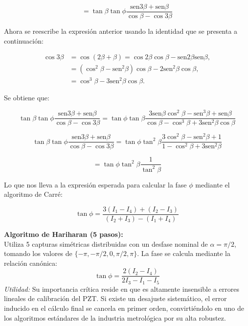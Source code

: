\documentclass[12pt,letterpaper]{article}
\begin{document}
\begin{enumerate}
		\begin{equation}
			= \tan\beta\tan\phi\frac{\text{sen}3\beta + \text{sen}\beta}{\cos\beta - \cos3\beta}
		\end{equation}
		
		Ahora se reescribe la expresión anterior usando la identidad que se presenta a continuación:
		
		\begin{equation}
			\begin{aligned}
				\cos3\beta &= \cos(2\beta + \beta) = \cos2\beta\cos\beta - \text{sen}2\beta\text{sen}\beta, \\
				&= (\cos^2\beta - \text{sen}^2\beta)\cos\beta - 2\text{sen}^2\beta\cos\beta, \\
				&= \cos^3\beta - 3\text{sen}^2\beta\cos\beta.
			\end{aligned}
		\end{equation}
		
		Se obtiene que:	
		
		\begin{equation}
			\tan\beta\tan\phi\frac{\text{sen}3\beta + \text{sen}\beta}{\cos\beta - \cos3\beta} = \tan\phi\tan\beta\frac{3\text{sen}\beta\cos^2\beta - \text{sen}^3\beta + \text{sen}\beta}{\cos\beta - \cos^3\beta + 3\text{sen}^2\beta\cos\beta}
		\end{equation}
		
		\begin{equation}
			\tan\beta\tan\phi\frac{\text{sen}3\beta + \text{sen}\beta}{\cos\beta - \cos3\beta} = \tan\phi\tan^2\beta\frac{3\cos^2\beta - \text{sen}^2\beta + 1}{1 - \cos^2\beta + 3\text{sen}^2\beta}
		\end{equation}
		
		\begin{equation}
			= \tan\phi\tan^2\beta\frac{1}{\tan^2\beta}
		\end{equation}
		
		Lo que nos lleva a la expresión esperada para calcular la fase $\phi$ mediante el algoritmo de Carré:
		
		\begin{equation}
			\tan\phi = \frac{3(I_1 - I_4) + (I_2 - I_3)}{(I_2 + I_3) - (I_1 + I_4)}
		\end{equation}
		
		
		\vspace{0.2cm}
		\textbf{Algoritmo de Hariharan (5 pasos):} \\
		Utiliza 5 capturas simétricas distribuidas con un desfase nominal de $\alpha = \pi/2$, tomando los valores de $\{- \pi, -\pi/2, 0, \pi/2, \pi\}$. La fase se calcula mediante la relación canónica:
		\[ \tan\phi = \frac{2(I_2 - I_4)}{2I_3 - I_1 - I_5} \]
		\textit{Utilidad:} Su importancia crítica reside en que es altamente insensible a errores lineales de calibración del PZT. Si existe un desajuste sistemático, el error inducido en el cálculo final se cancela en primer orden, convirtiéndolo en uno de los algoritmos estándares de la industria metrológica por su alta robustez.
		\vspace{0.5cm}
		

\end{enumerate}
\end{document}
